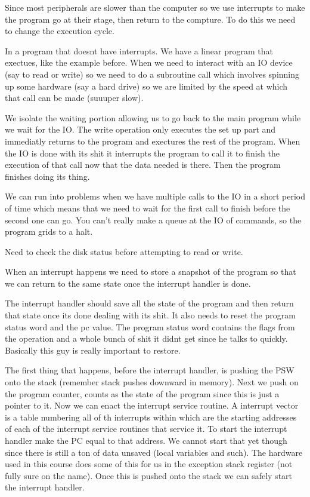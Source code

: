 \documentclass[12pt]{article}
\begin{document}

Since most peripherals are slower than the computer so we use interrupts to make the program go at their stage, then return to the compture. To do this we need to change the execution cycle.



In a program that doesnt have interrupts. We have a linear program that exectues, like the example before. When we need to interact with an IO device (say to read or write) so we need to do a subroutine call which involves spinning up some hardware (say a hard drive) so we are limited by the speed at which that call can be made (suuuper slow).



 We isolate the waiting portion allowing us to go back to the main program while we wait for the IO. The write operation only executes the set up part and immediatly returns to the program and exectures the rest of the program. When the IO is done with its shit it interrupts the program to call it to finish the execution of that call now that the data needed is there. Then the program finishes doing its thing.

 

We can run into problems when we have multiple calls to the IO in a short period of time which means that we need to wait for the first call to finish before the second one can go. You can't really make a queue at the IO of commands, so the program grids to a halt.

Need to check the disk status before attempting to read or write.


When an interrupt happens we need to store a snapshot of the program so that we can return to the same state once the interrupt handler is done.


The interrupt handler should save all the state of the program and then return that state once its done dealing with its shit. It also needs to reset the program status word and the pc value. The program status word contains the flags from the operation and a whole bunch of shit it didnt get since he talks to quickly. Basically this guy is really important to restore.


The first thing that happens, before the interrupt handler, is pushing the PSW onto the stack (remember stack pushes downward in memory). Next we push on the program counter, counts as the state of the program since this is just a pointer to it. Now we can enact the interrupt service routine. A interrupt vector is a table numbering all of th interrupts within which are the starting addresses of each of the interrupt service routines that service it. To start the interrupt handler make the PC equal to that address. We cannot start that yet though since there is still a ton of data unsaved (local variables and such).  The hardware used in this course does some of this for us in the exception stack register (not fully sure on the name). Once this is pushed onto the stack we can safely start the interrupt handler.
\end{document}
